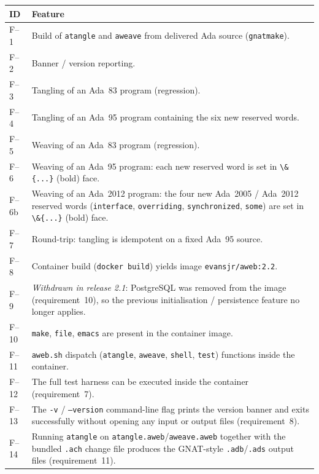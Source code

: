 \documentclass[11pt]{article}
\begin{document}
\begin{center}
\begin{tabularx}{\linewidth}{@{}lX@{}}
\toprule
ID   & Feature\\
\midrule
F--1  & Build of \texttt{atangle} and \texttt{aweave} from delivered Ada
        source (\texttt{gnatmake}).\\
F--2  & Banner / version reporting.\\
F--3  & Tangling of an Ada~83 program (regression).\\
F--4  & Tangling of an Ada~95 program containing the six new reserved
        words.\\
F--5  & Weaving of an Ada~83 program (regression).\\
F--6  & Weaving of an Ada~95 program: each new reserved word is set in
        \verb|\&{...}| (bold) face.\\
F--6b & Weaving of an Ada~2012 program: the four new Ada~2005 / Ada~2012
        reserved words (\texttt{interface}, \texttt{overriding},
        \texttt{synchronized}, \texttt{some}) are set in
        \verb|\&{...}| (bold) face.\\
F--7  & Round-trip: tangling is idempotent on a fixed Ada~95 source.\\
F--8  & Container build (\texttt{docker build}) yields image
        \texttt{evansjr/aweb:2.2}.\\
F--9  & \emph{Withdrawn in release 2.1}: PostgreSQL was removed from the
        image (requirement~10), so the previous initialisation /
        persistence feature no longer applies.\\
F--10 & \texttt{make}, \texttt{file}, \texttt{emacs} are present in the
        container image.\\
F--11 & \texttt{aweb.sh} dispatch (\texttt{atangle}, \texttt{aweave},
        \texttt{shell}, \texttt{test}) functions inside the container.\\
F--12 & The full test harness can be executed inside the container
        (requirement~7).\\
F--13 & The \texttt{-v} / \texttt{--version} command-line flag prints the
        version banner and exits successfully without opening any input
        or output files (requirement~8).\\
F--14 & Running \texttt{atangle} on \texttt{atangle.aweb}/\texttt{aweave.aweb}
        together with the bundled \texttt{.ach} change file produces the
        GNAT-style \texttt{.adb}/\texttt{.ads} output files
        (requirement~11).\\
\bottomrule
\end{tabularx}
\end{center}
\end{document}
